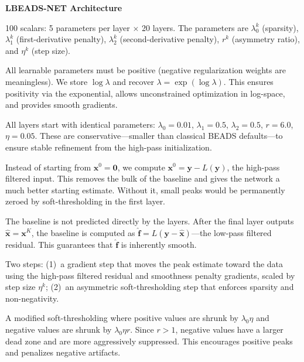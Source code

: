 \documentclass[11pt, letterpaper]{article}
\begin{document}
\vspace{0.8em}
{\large\bfseries\sffamily\color{SectionBlue} LBEADS-NET Architecture}\par\vspace{0.2em}

{100 scalars: 5 parameters per layer $\times$ 20 layers.  The parameters are $\lambda_0^k$ (sparsity), $\lambda_1^k$ (first-derivative penalty), $\lambda_2^k$ (second-derivative penalty), $r^k$ (asymmetry ratio), and $\eta^k$ (step size).}

{All learnable parameters must be positive (negative regularization weights are meaningless).  We store $\log\lambda$ and recover $\lambda = \exp(\log\lambda)$.  This ensures positivity via the exponential, allows unconstrained optimization in log-space, and provides smooth gradients.}

{All layers start with identical parameters: $\lambda_0 = 0.01$, $\lambda_1 = 0.5$, $\lambda_2 = 0.5$, $r = 6.0$, $\eta = 0.05$.  These are conservative---smaller than classical BEADS defaults---to ensure stable refinement from the high-pass initialization.}

{Instead of starting from $\mathbf{x}^0 = \mathbf{0}$, we compute $\mathbf{x}^0 = \mathbf{y} - L(\mathbf{y})$, the high-pass filtered input.  This removes the bulk of the baseline and gives the network a much better starting estimate.  Without it, small peaks would be permanently zeroed by soft-thresholding in the first layer.}

{The baseline is not predicted directly by the layers.  After the final layer outputs $\hat{\mathbf{x}} = \mathbf{x}^K$, the baseline is computed as $\hat{\mathbf{f}} = L(\mathbf{y} - \hat{\mathbf{x}})$---the low-pass filtered residual.  This guarantees that $\hat{\mathbf{f}}$ is inherently smooth.}

{Two steps: (1)~a gradient step that moves the peak estimate toward the data using the high-pass filtered residual and smoothness penalty gradients, scaled by step size $\eta^k$; (2)~an asymmetric soft-thresholding step that enforces sparsity and non-negativity.}

{A modified soft-thresholding where positive values are shrunk by $\lambda_0\eta$ and negative values are shrunk by $\lambda_0\eta r$.  Since $r > 1$, negative values have a larger dead zone and are more aggressively suppressed.  This encourages positive peaks and penalizes negative artifacts.}
\end{document}
